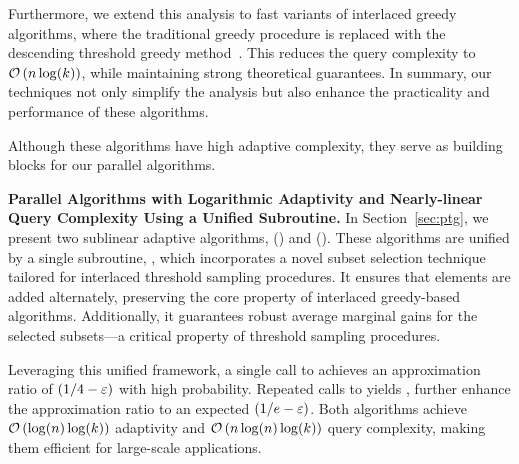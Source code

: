 Furthermore, we extend this analysis to fast variants of interlaced greedy algorithms, 
where the traditional greedy procedure is replaced with 
the descending threshold greedy method~\citep{DBLP:conf/soda/BadanidiyuruV14}.
This reduces the query complexity to $\mathcal O \left( n\log(k) \right)$,
while maintaining strong theoretical guarantees.
In summary, our techniques not only simplify the analysis but also 
enhance the practicality and performance of these algorithms.

Although these algorithms have high adaptive complexity,
they serve as building blocks for our parallel algorithms.



\textbf{Parallel Algorithms with Logarithmic Adaptivity and Nearly-linear Query Complexity
Using a Unified Subroutine.}
In Section~\ref{sec:ptg},
we present two sublinear adaptive algorithms, 
\ptgone (\ptgoneshort) and \ptgtwo (\ptgtwoshort).
These algorithms are unified by a single subroutine, \ptgoneshort,
which incorporates a novel subset selection technique 
tailored for interlaced threshold sampling procedures.
It ensures that elements are added alternately, preserving the core property of interlaced greedy-based algorithms. Additionally, it guarantees robust average marginal gains for the selected subsets—a critical property of threshold sampling procedures.

Leveraging this unified framework, a single call to \ptgtwoshort achieves an approximation ratio of $(1/4-\varepsilon)$ with high probability.
Repeated calls to \ptgtwoshort yields \ptgtwoshort,
further enhance the approximation ratio to an expected $(1/e-\varepsilon)$.
Both algorithms achieve $\mathcal O \left( \log(n) \log(k) \right)$ adaptivity
and $\mathcal O \left( n\log(n)\log(k) \right)$ query complexity,
making them efficient for large-scale applications.

